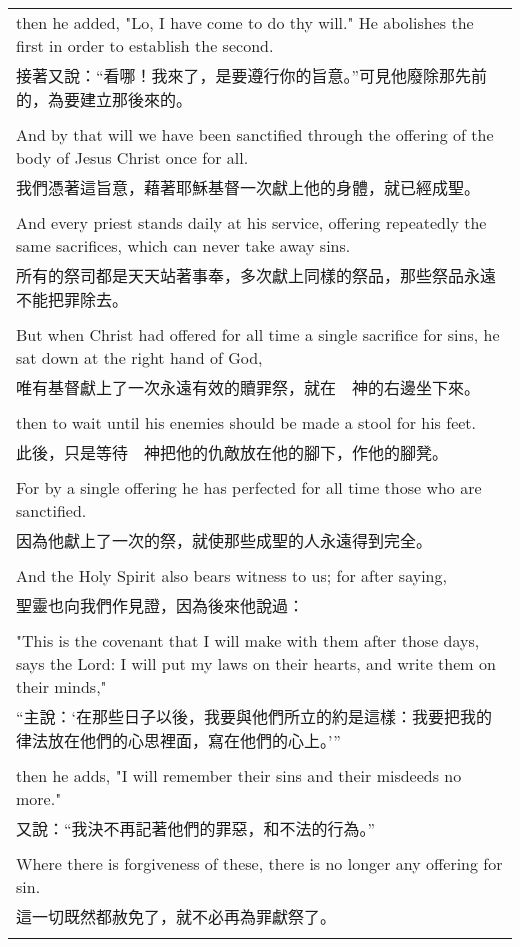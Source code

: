 \begin{tabularx}{\textwidth}{p{}}
then he added, "Lo, I have come to do thy will." He abolishes the first in order to establish the second. \\
接著又說：“看哪！我來了，是要遵行你的旨意。”可見他廢除那先前的，為要建立那後來的。 \\ \\
And by that will we have been sanctified through the offering of the body of Jesus Christ once for all. \\
我們憑著這旨意，藉著耶穌基督一次獻上他的身體，就已經成聖。 \\ \\
And every priest stands daily at his service, offering repeatedly the same sacrifices, which can never take away sins. \\
所有的祭司都是天天站著事奉，多次獻上同樣的祭品，那些祭品永遠不能把罪除去。 \\ \\
But when Christ had offered for all time a single sacrifice for sins, he sat down at the right hand of God, \\
唯有基督獻上了一次永遠有效的贖罪祭，就在　神的右邊坐下來。 \\ \\
then to wait until his enemies should be made a stool for his feet. \\
此後，只是等待　神把他的仇敵放在他的腳下，作他的腳凳。 \\ \\
For by a single offering he has perfected for all time those who are sanctified. \\
因為他獻上了一次的祭，就使那些成聖的人永遠得到完全。 \\ \\
And the Holy Spirit also bears witness to us; for after saying, \\
聖靈也向我們作見證，因為後來他說過： \\ \\
"This is the covenant that I will make with them after those days, says the Lord: I will put my laws on their hearts, and write them on their minds," \\
“主說：‘在那些日子以後，我要與他們所立的約是這樣：我要把我的律法放在他們的心思裡面，寫在他們的心上。’” \\ \\
then he adds, "I will remember their sins and their misdeeds no more." \\
又說：“我決不再記著他們的罪惡，和不法的行為。” \\ \\
Where there is forgiveness of these, there is no longer any offering for sin. \\
這一切既然都赦免了，就不必再為罪獻祭了。 \\ \\

\hline
\end{tabularx}

